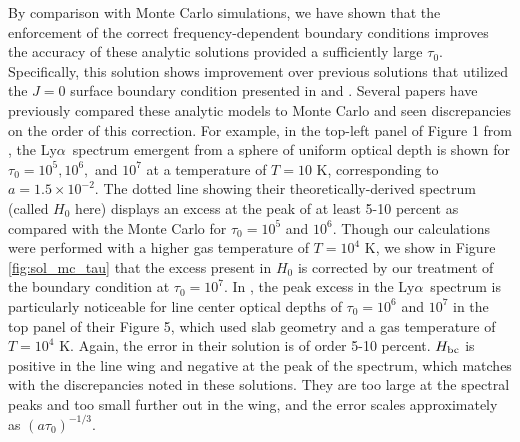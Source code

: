 \documentclass[linenumbers]{aastex63}
\newcommand\lya{Ly$\alpha$\ }
\begin{document}
By comparison with Monte Carlo simulations, we have shown that the enforcement of the correct frequency-dependent boundary conditions improves the accuracy of these analytic solutions provided a sufficiently large $\tau_0$. Specifically, this solution shows improvement over previous solutions that utilized the $J=0$ surface boundary condition presented in \cite{1973MNRAS.162...43H} and \cite{1990ApJ...350..216N}. Several papers have previously compared these analytic models to Monte Carlo and seen discrepancies on the order of this correction. For example, in the top-left panel of Figure 1 from \cite{2006ApJ...649...14D}, the \lya spectrum emergent from a sphere of uniform optical depth is shown for $\tau_0=10^5, 10^6,$ and $10^7$ at a temperature of $T=10$ K, corresponding to $a=1.5 \times 10^{-2}$. The dotted line showing their theoretically-derived spectrum (called $H_0$ here) displays an excess at the peak of at least 5-10 percent as compared with the Monte Carlo for $\tau_0=10^5$ and $10^6$. Though our calculations were performed with a higher gas temperature of $T=10^4$ K, we show in Figure \ref{fig:sol_mc_tau} that the excess present in $H_0$ is corrected by our treatment of the boundary condition at $\tau_0 = 10^7$. In \citet{2015MNRAS.449.4336S}, the peak excess in the \lya spectrum is particularly noticeable for line center optical depths of $\tau_0=10^6$ and $10^7$ in the top panel of their Figure 5, which used slab geometry and a gas temperature of $T=10^4$ K. Again, the error in their solution is of order 5-10 percent. $H_{\rm bc}$ is positive in the line wing and negative at the peak of the spectrum, which matches with the discrepancies noted in these solutions. They are too large at the spectral peaks and too small further out in the wing, and the error scales approximately as $(a\tau_0)^{-1/3}$.
\end{document}
